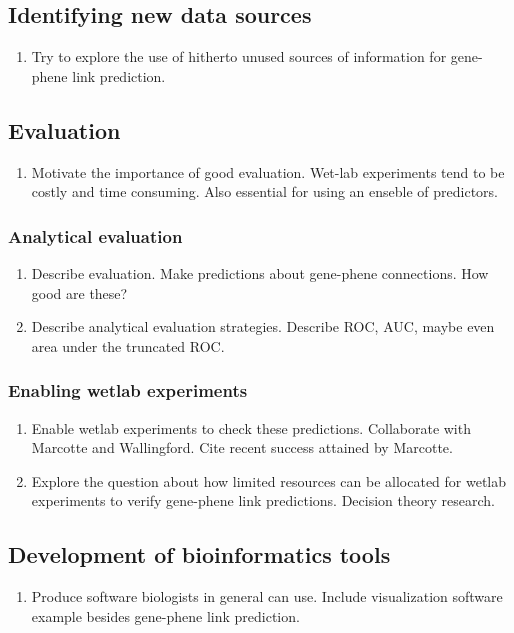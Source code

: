 \documentclass[11pt]{article}
\begin{document}
\subsection{Identifying new data sources}
\begin{enumerate}
 \item Try to explore the use of hitherto unused sources of information for gene-phene link prediction.
\end{enumerate}
 

\subsection{Evaluation}
\begin{enumerate}
 \item Motivate the importance of good evaluation.
  \subitem Wet-lab experiments tend to be costly and time consuming.
  \subitem Also essential for using an enseble of predictors.
\end{enumerate}

\subsubsection{Analytical evaluation}
\begin{enumerate}
 \item Describe evaluation. Make predictions about gene-phene connections. How good are these?
 \item Describe analytical evaluation strategies. Describe ROC, AUC, maybe even area under the truncated ROC.
\end{enumerate}

\subsubsection{Enabling wetlab experiments}
\begin{enumerate}
 \item Enable wetlab experiments to check these predictions. Collaborate with Marcotte and Wallingford. Cite recent success attained by Marcotte.
 \item Explore the question about how limited resources can be allocated for wetlab experiments to verify gene-phene link predictions. Decision theory research.
\end{enumerate}

\subsection{Development of bioinformatics tools}
\begin{enumerate}
 \item Produce software biologists in general can use. Include visualization software example besides gene-phene link prediction.
\end{enumerate}
\end{document}
